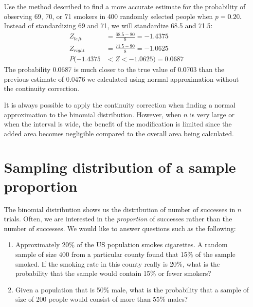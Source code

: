 \begin{example}{Use the method described to find a more accurate estimate for the probability of observing 69, 70, or 71 smokers in 400 randomly selected people when $p=0.20$.}
Instead of standardizing 69 and 71, we will standardize 68.5 and 71.5:
\begin{align*}
Z_{left} &= \frac{68.5-80}{8} = -1.4375 \\
Z_{right} &= \frac{71.5-80}{8} = -1.0625 \\
P(-1.4375 &< Z < -1.0625) = 0.0687
\end{align*}
The probability 0.0687 is much closer to the true value of 0.0703 than the previous estimate of 0.0476 we calculated using normal approximation without the continuity correction.
\end{example}

It is always possible to apply the continuity correction when finding a normal approximation to the binomial distribution. However, when $n$ is very large or when the interval is wide, the benefit of the modification is limited since the added area becomes negligible compared to the overall area being calculated.




\section{Sampling distribution of a sample proportion}
\label{distributionphat}

The binomial distribution shows us the distribution of number of successes in $n$ trials. Often, we are interested in the \emph{proportion} of successes rather than the number of successes. We would like to answer questions such as the following:

\begin{enumerate}
\item Approximately 20\% of the US population smokes cigarettes. A random sample of size 400 from a particular county found that 15\% of the sample smoked. If the smoking rate in this county really is 20\%, what is the probability that the sample would contain 15\% or fewer smokers?  

\item Given a population that is 50\% male, what is the probability that a sample of size of 200 people would consist of more than 55\% males?

\end{enumerate}

